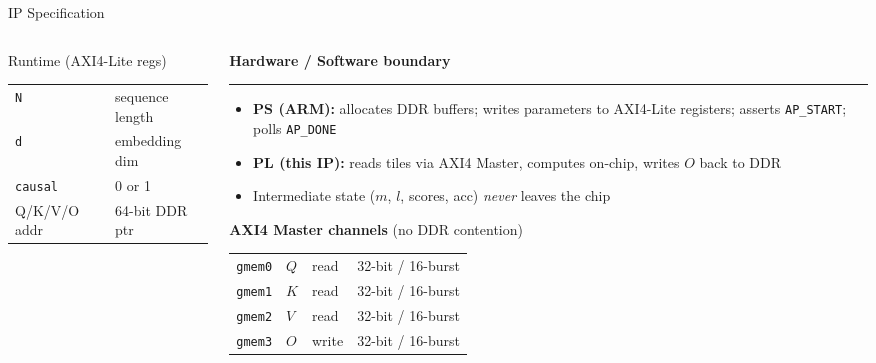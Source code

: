 \documentclass[aspectratio=169, 10pt]{beamer}
\newcommand{\muted}[1]{{\color{SlateGry}#1}}
\newcommand{\hrulefull}{%
  \par\vspace{1pt}%
  {\color{SlateGry!40}\rule{\linewidth}{0.4pt}}%
  \par\vspace{2pt}%
}
\begin{document}
\begin{frame}{IP Specification}
\begin{columns}[T]
\begin{column}{0.38\textwidth}
      \vspace{0.3cm}
      \begin{block}{Runtime (AXI4-Lite regs)}
        \vspace{2pt}
        \begin{tabular}{ll}
          \texttt{N}       & sequence length \\
          \texttt{d}       & embedding dim   \\
          \texttt{causal}  & 0 or 1          \\
          Q/K/V/O addr     & 64-bit DDR ptr  \\
        \end{tabular}
        \vspace{2pt}
      \end{block}
    \end{column}
    \begin{column}{0.58\textwidth}
      \vspace{0.1cm}
      \textbf{Hardware / Software boundary}
      \hrulefull
      \begin{itemize}\setlength\itemsep{4pt}
        \item \textbf{PS (ARM):} allocates DDR buffers; writes parameters
              to AXI4-Lite registers; asserts \texttt{AP\_START};
              polls \texttt{AP\_DONE}
        \item \textbf{PL (this IP):} reads tiles via AXI4 Master,
              computes on-chip, writes $O$ back to DDR
        \item Intermediate state ($m$, $l$, scores, acc)
              \emph{never} leaves the chip
      \end{itemize}

      \vspace{0.25cm}
      \textbf{AXI4 Master channels} \muted{(no DDR contention)}

      \vspace{0.1cm}
      \begin{tabular}{llll}
        \texttt{gmem0} & $Q$ & read  & 32-bit / 16-burst \\
        \texttt{gmem1} & $K$ & read  & 32-bit / 16-burst \\
        \texttt{gmem2} & $V$ & read  & 32-bit / 16-burst \\
        \texttt{gmem3} & $O$ & write & 32-bit / 16-burst \\
      \end{tabular}
    \end{column}
  \end{columns}
\end{frame}
\end{document}
